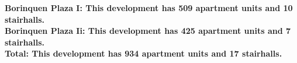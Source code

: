 \bf{Borinquen Plaza I}: This development has 509 apartment units and 10 stairhalls.\\\bf{Borinquen Plaza Ii}: This development has 425 apartment units and 7 stairhalls.\\\bf{Total}: This development has 934 apartment units and 17 stairhalls.\\